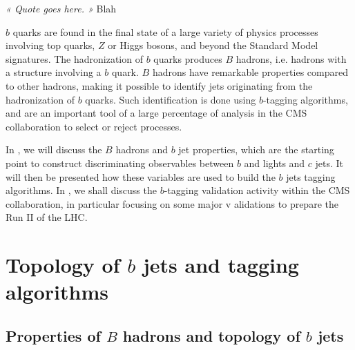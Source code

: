 \setcounter{mtc}{5}
\hspace*{0.66\textwidth}
\begin{minipage}{0.33\textwidth}
\emph{« Quote goes here. »}
\hspace*{0.6\textwidth} Blah
\end{minipage}
\minitoc
\newpage

    $b$ quarks are found in the final state of a large variety of physics processes
    involving top quarks, $Z$ or Higgs bosons, and beyond the Standard Model signatures.
    The hadronization of $b$ quarks produces $B$ hadrons, i.e. hadrons with a structure
    involving a $b$ quark. $B$ hadrons have remarkable properties compared to other hadrons,
    making it possible to identify jets originating from the hadronization of $b$ quarks.
    Such identification is done using $b$-tagging algorithms, and are an important tool of
    a large percentage of analysis in the CMS collaboration to select or reject processes.

    In , we will discuss the $B$ hadrons and $b$ jet properties,
    which are the starting point to construct discriminating observables between $b$ and lights
    and $c$ jets. It will then be presented how these variables are used to build the $b$ jets
    tagging algorithms.
    In , we shall discuss the $b$-tagging
    validation activity within the CMS collaboration, in particular focusing on some major v
    alidations to prepare the Run II of the LHC.

    \section{Topology of $b$ jets and tagging algorithms \label{sec:bTagAlgorithms}}

    \subsection{Properties of $B$ hadrons and topology of $b$ jets}

